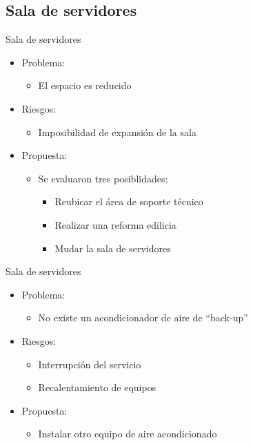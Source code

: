 \documentclass[spanish]{beamer}
\begin{document}
\subsection{Sala de servidores}

\begin{frame}{Sala de servidores}
  \begin{itemize}
  \item Problema:
    \begin{itemize}
    \item El espacio es reducido
    \end{itemize}
    \item Riesgos:
      \begin{itemize}
      \item Imposibilidad de expansión de la sala
      \end{itemize}
  \item Propuesta:
    \begin{itemize}
    \item Se evaluaron tres posiblidades:
      \begin{itemize}
      \item Reubicar el área de soporte técnico
      \item Realizar una reforma edilicia
      \item Mudar la sala de servidores
      \end{itemize}
    \end{itemize}
  \end{itemize}
\end{frame}


\begin{frame}{Sala de servidores}
  \begin{itemize}
  \item Problema:
    \begin{itemize}
    \item No existe un acondicionador de aire de ``back-up''
    \end{itemize}
    \item Riesgos:
      \begin{itemize}
      \item Interrupción del servicio
      \item Recalentamiento de equipos
      \end{itemize}
  \item Propuesta:
    \begin{itemize}
    \item Instalar otro equipo de aire acondicionado
    \end{itemize}
  \end{itemize}
\end{frame}
\end{document}

